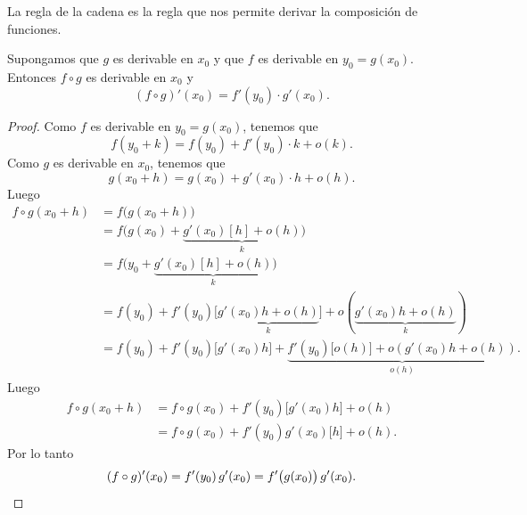 La regla de la cadena es la regla que nos permite derivar la composición de funciones.

\begin{proposition}
Supongamos que $g$ es derivable en $x_0$ y que $f$ es derivable en $y_0 = g(x_0)$.
Entonces $f\circ g$ es derivable en $x_0$ y
\[
(f\circ g)'(x_0) = f'(y_0) \cdot g'(x_0).
\]
\end{proposition}

\begin{proof}
Como $f$ es derivable en $y_0 = g(x_0)$, tenemos que
\[
f(y_0+k) = f(y_0) + f'(y_0) \cdot k + o(k).
\]
Como $g$ es derivable en $x_0$, tenemos que 
\[
g(x_0+h) = g(x_0) + g'(x_0) \cdot h + o(h).
\]
Luego
\begin{align*}
    f\circ g(x_0+h) 
    &= f\big(g(x_0+h)\big) \\
    &= f\big(g(x_0)+\underbrace{g'(x_0)[h]+o(h)}_k \big) \\
    &= f\big(y_0 +\underbrace{g'(x_0)[h]+o(h)}_k \big) \\
    &= f(y_0) + f'(y_0) \big[\underbrace{g'(x_0)h+o(h)}_k\big] + o(\underbrace{g'(x_0)h+o(h)}_k)
    \\
    &= f(y_0) + f'(y_0) \big[g'(x_0)h\big] +
        \underbrace{f'(y_0)\big[o(h)\big] + o(g'(x_0)h+o(h))}_{o(h)}.
\end{align*}
Luego
\begin{align*}
    f\circ g(x_0+h) &= f\circ g(x_0) + f'(y_0) \big[g'(x_0)h\big] + o(h)\\
     &= f\circ g(x_0) + f'(y_0) g'(x_0) \big[h\big] + o(h).
\end{align*}
Por lo tanto
\[
(f\circ g)'(x_0) = f'(y_0)\, g'(x_0) = f'\big(g(x_0)\big) \, g'(x_0).
\qedhere
\]
\end{proof}

